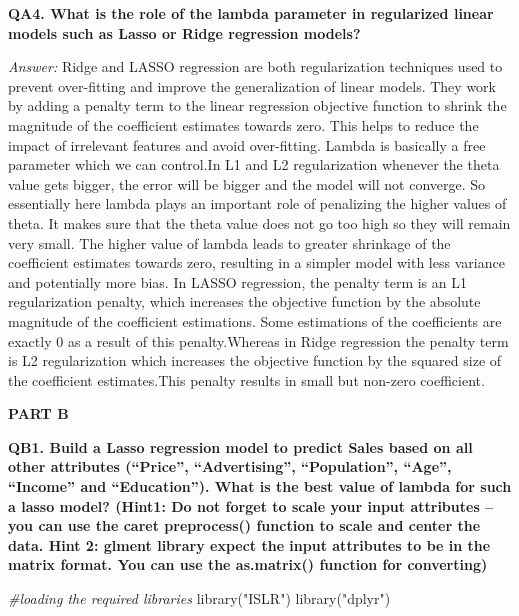 \documentclass[
]{article}
\newenvironment{Shaded}{\begin{snugshade}}{\end{snugshade}}
\newcommand{\CommentTok}[1]{\textcolor[rgb]{0.56,0.35,0.01}{\textit{#1}}}
\newcommand{\FunctionTok}[1]{\textcolor[rgb]{0.00,0.00,0.00}{#1}}
\newcommand{\NormalTok}[1]{#1}
\newcommand{\StringTok}[1]{\textcolor[rgb]{0.31,0.60,0.02}{#1}}
\begin{document}
\textbf{QA4. What is the role of the lambda parameter in regularized
linear models such as Lasso or Ridge regression models? }

\emph{Answer:} Ridge and LASSO regression are both regularization
techniques used to prevent over-fitting and improve the generalization
of linear models. They work by adding a penalty term to the linear
regression objective function to shrink the magnitude of the coefficient
estimates towards zero. This helps to reduce the impact of irrelevant
features and avoid over-fitting. Lambda is basically a free parameter
which we can control.In L1 and L2 regularization whenever the theta
value gets bigger, the error will be bigger and the model will not
converge. So essentially here lambda plays an important role of
penalizing the higher values of theta. It makes sure that the theta
value does not go too high so they will remain very small. The higher
value of lambda leads to greater shrinkage of the coefficient estimates
towards zero, resulting in a simpler model with less variance and
potentially more bias. In LASSO regression, the penalty term is an L1
regularization penalty, which increases the objective function by the
absolute magnitude of the coefficient estimations. Some estimations of
the coefficients are exactly 0 as a result of this penalty.Whereas in
Ridge regression the penalty term is L2 regularization which increases
the objective function by the squared size of the coefficient
estimates.This penalty results in small but non-zero coefficient.

\textbf{PART B}

\textbf{QB1. Build a Lasso regression model to predict Sales based on
all other attributes (``Price'', ``Advertising'', ``Population'',
``Age'', ``Income'' and ``Education''). What is the best value of lambda
for such a lasso model? (Hint1: Do not forget to scale your input
attributes -- you can use the caret preprocess() function to scale and
center the data. Hint 2: glment library expect the input attributes to
be in the matrix format. You can use the as.matrix() function for
converting)}

\begin{Shaded}
\begin{Highlighting}[]
\CommentTok{\#loading the required libraries}
\FunctionTok{library}\NormalTok{(}\StringTok{"ISLR"}\NormalTok{)}
\FunctionTok{library}\NormalTok{(}\StringTok{"dplyr"}\NormalTok{)}
\end{Highlighting}
\end{Shaded}
\end{document}
